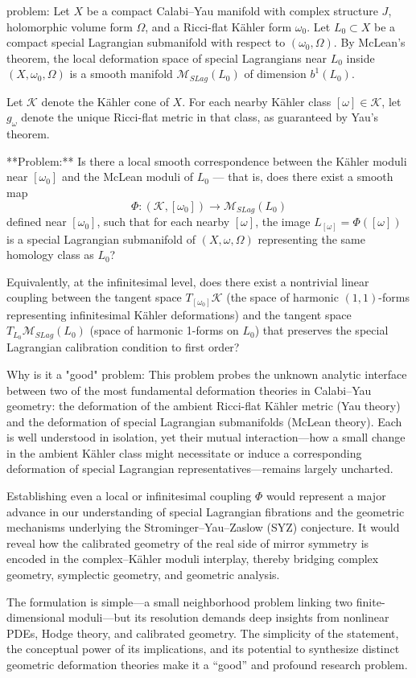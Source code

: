 problem:  
Let \( X \) be a compact Calabi–Yau manifold with complex structure \( J \), holomorphic volume form \( \Omega \), and a Ricci-flat Kähler form \( \omega_0 \).  
Let \( L_0 \subset X \) be a compact special Lagrangian submanifold with respect to \( (\omega_0, \Omega) \).  
By McLean’s theorem, the local deformation space of special Lagrangians near \( L_0 \) inside \( (X,\omega_0,\Omega) \) is a smooth manifold \( \mathcal{M}_{SLag}(L_0) \) of dimension \( b^1(L_0) \).  

Let \( \mathcal{K} \) denote the Kähler cone of \( X \). For each nearby Kähler class \( [\omega] \in \mathcal{K} \), let \( g_\omega \) denote the unique Ricci-flat metric in that class, as guaranteed by Yau’s theorem.

**Problem:**  
Is there a local smooth correspondence between the Kähler moduli near \([\omega_0]\) and the McLean moduli of \(L_0\) — that is, does there exist a smooth map  
\[
\Phi : (\mathcal{K}, [\omega_0]) \longrightarrow \mathcal{M}_{SLag}(L_0)
\]
defined near \([\omega_0]\), such that for each nearby \([\omega]\), the image \(L_{[\omega]} = \Phi([\omega])\) is a special Lagrangian submanifold of \((X, \omega, \Omega)\) representing the same homology class as \(L_0\)?  

Equivalently, at the infinitesimal level, does there exist a nontrivial linear coupling between the tangent space \(T_{[\omega_0]} \mathcal{K}\) (the space of harmonic \((1,1)\)-forms representing infinitesimal Kähler deformations) and the tangent space \(T_{L_0}\mathcal{M}_{SLag}(L_0)\) (space of harmonic 1-forms on \(L_0\)) that preserves the special Lagrangian calibration condition to first order?

Why is it a "good" problem:  
This problem probes the unknown analytic interface between two of the most fundamental deformation theories in Calabi–Yau geometry: the deformation of the ambient Ricci-flat Kähler metric (Yau theory) and the deformation of special Lagrangian submanifolds (McLean theory). Each is well understood in isolation, yet their mutual interaction—how a small change in the ambient Kähler class might necessitate or induce a corresponding deformation of special Lagrangian representatives—remains largely uncharted.

Establishing even a local or infinitesimal coupling \(\Phi\) would represent a major advance in our understanding of special Lagrangian fibrations and the geometric mechanisms underlying the Strominger–Yau–Zaslow (SYZ) conjecture. It would reveal how the calibrated geometry of the real side of mirror symmetry is encoded in the complex–Kähler moduli interplay, thereby bridging complex geometry, symplectic geometry, and geometric analysis.  

The formulation is simple—a small neighborhood problem linking two finite-dimensional moduli—but its resolution demands deep insights from nonlinear PDEs, Hodge theory, and calibrated geometry. The simplicity of the statement, the conceptual power of its implications, and its potential to synthesize distinct geometric deformation theories make it a “good” and profound research problem.